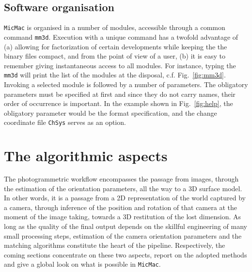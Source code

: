 \documentclass[twocolumn]{bmcart}%
\begin{document}
\subsection*{Software organisation}
{\tt MicMac} is organised in a number of modules, accessible through a common command {\tt mm3d}. Execution with a unique command has a twofold advantage of (a) allowing for factorization of certain developments while keeping the the binary files compact, and from the point of view of a user, (b) it is easy to remember giving instantaneous access to all modules. For instance, typing the {\tt mm3d} will print the list of the modules at the disposal, c.f. Fig.~\ref{fig:mm3d}.
%
Invoking a selected module is followed by a number of parameters. The obligatory parameters must be specified at first and since they do not carry names, their order of occurrence is important. In the example shown in Fig.~\ref{fig:help}, the obligatory parameter would be the format specification, and the change coordinate file {\tt ChSys} serves as an option.


\section*{The algorithmic aspects}
The photogrammetric workflow encompasses the passage from images, through the estimation of the orientation parameters, all the way to a 3D surface model. In other words, it is a passage from a 2D representation of the world captured by a camera, through inference of the position and rotation of that camera at the moment of the image taking, towards a 3D restitution of the lost dimension. As long as the quality of the final output depends on the skillful engineering of many small processing steps, estimation of the camera orientation parameters and the matching algorithms constitute the heart of the pipeline. Respectively, the coming sections concentrate on these two aspects, report on the adopted methods and give a global look on what is possible in {\tt MicMac}.

 
\end{document}
